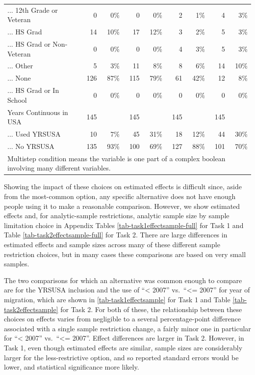 \documentclass[
  letterpaper,
  DIV=11,
  numbers=noendperiod]{scrartcl}
\begin{document}
\begin{table}[!htbp]
{\begin{tabular}{lrrrrrrrr}
... 12th Grade or Veteran & 0 & 0\% & 0 & 0\% & 2 & 1\% & 4 & 3\% \\ 
... HS Grad & 14 & 10\% & 17 & 12\% & 3 & 2\% & 5 & 3\% \\ 
... HS Grad or Non-Veteran & 0 & 0\% & 0 & 0\% & 4 & 3\% & 5 & 3\% \\ 
... Other & 5 & 3\% & 11 & 8\% & 8 & 6\% & 14 & 10\% \\ 
... None & 126 & 87\% & 115 & 79\% & 61 & 42\% & 12 & 8\% \\ 
... HS Grad or In School & 0 & 0\% & 0 & 0\% & 0 & 0\% & 0 & 0\% \\ 
Years Continuous in USA & 145 &  & 145 &  & 145 &  & 145 &  \\ 
... Used YRSUSA & 10 & 7\% & 45 & 31\% & 18 & 12\% & 44 & 30\% \\ 
... No YRSUSA & 135 & 93\% & 100 & 69\% & 127 & 88\% & 101 & 70\%\\ 
\hline
\hline
\multicolumn{9}{l}{Multistep condition means the variable is one part of a complex boolean involving many different variables.}\\ 
\end{tabular}
}
\end{table}

Showing the impact of these choices on estimated effects is difficult
since, aside from the most-common option, any specific alternative does
not have enough people using it to make a reasonable comparison.
However, we show estimated effects and, for analytic-sample
restrictions, analytic sample size by sample limitation choice in
Appendix Tables \ref{tab-task1effectsample-full} for Task 1 and Table
\ref{tab-task2effectsample-full} for Task 2. There are large differences
in estimated effects and sample sizes across many of these different
sample restriction choices, but in many cases these comparisons are
based on very small samples.

The two comparisons for which an alternative was common enough to
compare are for the YRSUSA inclusion and the use of ``\textless{} 2007''
vs.~``\textless= 2007'' for year of migration, which are shown in
\ref{tab-task1effectsample} for Task 1 and Table
\ref{tab-task2effectsample} for Task 2. For both of these, the
relationship between these choices on effects varies from negligible to
a several percentage-point difference associated with a single sample
restriction change, a fairly minor one in particular for ``\textless{}
2007'' vs.~``\textless= 2007''. Effect differences are larger in Task 2.
However, in Task 1, even though estimated effects are similar, sample
sizes are considerably larger for the less-restrictive option, and so
reported standard errors would be lower, and statistical significance
more likely.
\end{document}
